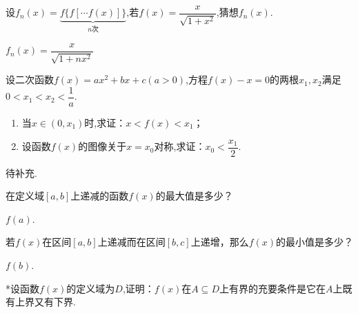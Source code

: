 \documentclass[lang=cn,newtx,10pt,scheme=chinese]{elegantbook}
\begin{document}
\begin{exercise}
  设$f_n(x)=\underbrace{f\{f[\cdots f(x)]\}}_{n\text{次}}$,若$f(x)=\dfrac{x}{\sqrt{1+x^2}}$,猜想$f_n(x)$.
\end{exercise}

\begin{solution}
  $f_{n}(x)=\dfrac{x}{\sqrt{1+nx^{2}}}$
\end{solution}

\begin{exercise}
  设二次函数$f(x)=ax^{2}+bx+c(a>0)$,方程$f(x)-x=0$的两根$x_1,x_2$满足$0<x_1<x_2<\dfrac1a$.
\end{exercise}

\begin{enumerate}
  \item 当$x\in(0,x_1)$时,求证：$x<f(x)<x_1$；
  \item 设函数$f(x)$的图像关于$x=x_0$对称,求证：$x_0<\dfrac{x_1}{2}$.
\end{enumerate}

\begin{solution}
  待补充.
\end{solution}

\begin{exercise}
  在定义域$[a,b]$上递减的函数$f(x)$的最大值是多少？
\end{exercise}

\begin{solution}
  $f(a)$.
\end{solution}

\begin{exercise}
  若$f(x)$在区间$[a,b]$上递减而在区间$[b,c]$上递增，那么$f(x)$的最小值是多少？
\end{exercise}

\begin{solution}
  $f(b)$.
\end{solution}

\begin{exercise}
  *设函数$f(x)$的定义域为$D$,证明：$f(x)$在$A\subseteq D$上有界的充要条件是它在$A$上既有上界又有下界.
\end{exercise}
\end{document}
